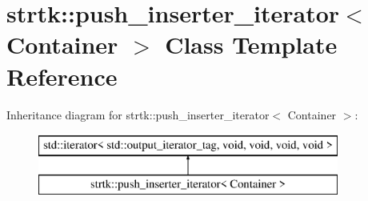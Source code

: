 \hypertarget{classstrtk_1_1push__inserter__iterator}{\section{strtk\-:\-:push\-\_\-inserter\-\_\-iterator$<$ Container $>$ Class Template Reference}
\label{classstrtk_1_1push__inserter__iterator}
}
Inheritance diagram for strtk\-:\-:push\-\_\-inserter\-\_\-iterator$<$ Container $>$\-:\begin{figure}[H]
\begin{center}
\leavevmode
\includegraphics[height=2.000000cm]{classstrtk_1_1push__inserter__iterator}
\end{center}
\end{figure}
